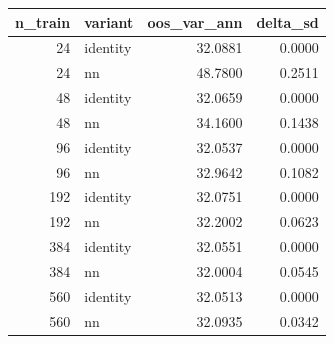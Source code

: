 \begin{tabular}{rlrr}
\toprule
n_train & variant & oos_var_ann & delta_sd \\
\midrule
24 & identity & 32.0881 & 0.0000 \\
24 & nn & 48.7800 & 0.2511 \\
48 & identity & 32.0659 & 0.0000 \\
48 & nn & 34.1600 & 0.1438 \\
96 & identity & 32.0537 & 0.0000 \\
96 & nn & 32.9642 & 0.1082 \\
192 & identity & 32.0751 & 0.0000 \\
192 & nn & 32.2002 & 0.0623 \\
384 & identity & 32.0551 & 0.0000 \\
384 & nn & 32.0004 & 0.0545 \\
560 & identity & 32.0513 & 0.0000 \\
560 & nn & 32.0935 & 0.0342 \\
\bottomrule
\end{tabular}

